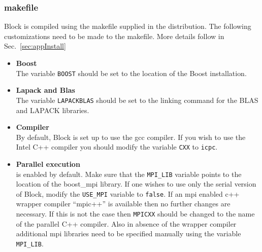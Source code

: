 \documentclass[letterpaper,12pt,aps, pra]{revtex4-1}
\begin{document}
\subsubsection{makefile}
Block is compiled using the makefile supplied in the distribution. The following customizations need to be made to the makefile. More details follow in Sec.~\ref{sec:appInstall}
\begin{itemize}
 \item \textbf{Boost}\\The variable \texttt{BOOST} should be set to the location of the Boost installation. 
\item \textbf{Lapack and Blas}\\ The variable \texttt{LAPACKBLAS} should be
set to the linking command for the BLAS and LAPACK libraries.
\item \textbf{Compiler}\\
   By default, Block is set up to use the gcc compiler. If you wish to use the Intel C++ compiler you should modify the variable \texttt{CXX} to \texttt{icpc}.
\item \textbf{Parallel execution}\\
	is enabled by default. Make sure that the \texttt{MPI\_LIB} variable points to the location of the boost\_mpi library. If one wishes to use only the serial version of Block, modify the \texttt{USE\_MPI} variable to \texttt{false}.
	If an mpi enabled c++ wrapper compiler ``mpic++'' is available then no further changes are necessary. If this is not the case then \texttt{MPICXX} should be changed to the name of the parallel C++ compiler.  Also in absence of the wrapper compiler additional mpi libraries need to be specified manually using the variable \texttt{MPI\_LIB}. %

\end{itemize}
\end{document}
